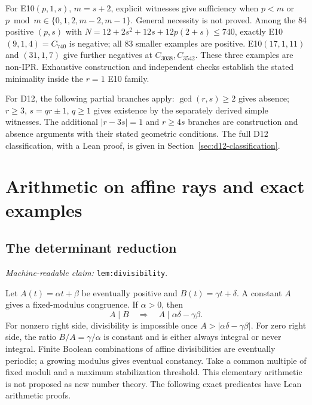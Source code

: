 \documentclass[11pt]{amsart}
\newcommand{\record}[1]{\nolinkurl{#1}}
\newcommand{\claimid}[1]{\par\nopagebreak\noindent\textit{Machine-readable claim:} \record{#1}.\par}
\theoremstyle{definition}\newtheorem{definition}{Definition}
\begin{document}
For E10$(p,1,s)$, $m=s+2$, explicit witnesses give
sufficiency when $p<m$ or
$p\bmod m\in\{0,1,2,m-2,m-1\}$. General necessity is not proved.
Among the 84 positive $(p,s)$ with
$N=12+2s^2+12s+12p(2+s)\le740$, exactly E10$(9,1,4)=C_{740}$
is negative; all 83 smaller examples are positive. E10$(17,1,11)$
and $(31,1,7)$ give further negatives at $C_{3038},C_{3542}$.
These three examples are non-IPR. Exhaustive construction and
independent checks establish the stated minimality inside the $r=1$
E10 family.

For D12, the following partial branches apply:
$\gcd(r,s)\ge2$ gives absence; $r\ge3$, $s=qr\pm1$, $q\ge1$
gives existence by the separately derived simple witnesses. The
additional $|r-3s|=1$ and $r\ge4s$ branches are construction and
absence arguments with their stated geometric conditions. The full D12 classification, with a Lean proof, is given in Section~\ref{sec:d12-classification}.

\section{Arithmetic on affine rays and exact examples}\label{sec:arithmetic}
\subsection{The determinant reduction}\label{lem:divisibility}
\claimid{lem:divisibility}
Let $A(t)=\alpha t+\beta$ be eventually positive and
$B(t)=\gamma t+\delta$. A constant $A$ gives a fixed-modulus
congruence. If $\alpha>0$, then
\begin{equation}\label{eq:determinant}
 A\mid B\quad\Longrightarrow\quad A\mid\alpha\delta-\gamma\beta.
\end{equation}
For nonzero right side, divisibility is impossible once
$A>|\alpha\delta-\gamma\beta|$. For zero right side, the ratio
$B/A=\gamma/\alpha$ is constant and is either always integral or
never integral. Finite Boolean combinations of affine divisibilities
are eventually periodic; a growing modulus gives eventual constancy.
Take a common multiple of fixed moduli and a maximum stabilization
threshold. This elementary arithmetic is not proposed as new number
theory. The following exact predicates have Lean arithmetic proofs.
\end{document}
